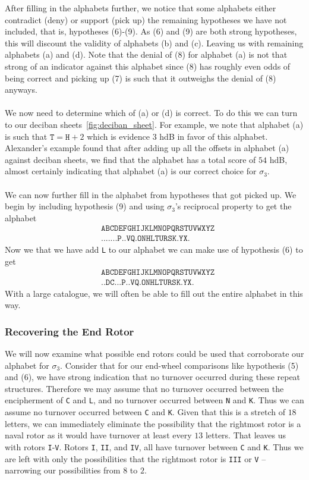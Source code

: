 \noindent  After filling in the alphabets further, we notice that some alphabets either contradict (deny) or support (pick up) the remaining hypotheses we have not included, that is, hypotheses (6)-(9). As (6) and (9) are both strong hypotheses, this will discount the validity of alphabets (b) and (c). Leaving us with remaining alphabets (a) and (d). Note that the denial of (8) for alphabet (a) is not that strong of an indicator against this alphabet since (8) has roughly even odds of being correct and picking up (7) is such that it outweighs the denial of (8) anyways.
\\\\We now need to determine which of (a) or (d) is correct. To do this we can turn to our deciban sheets~\ref{fig:deciban_sheet}. For example, we note that alphabet (a) is such that $\texttt{T} = \texttt{H} + 2$ which is evidence $3$ hdB in favor of this alphabet. Alexander's example found that after adding up all the offsets in alphabet (a) against deciban sheets, we find that the alphabet has a total score of $54$ hdB, almost certainly indicating that alphabet (a) is our correct choice for $\sigma_3$.
\\\\We can now further fill in the alphabet from hypotheses that got picked up. We begin by including hypothesis (9) and using $\sigma_3$'s reciprocal property to get the alphabet
\begin{align*}
	 & \texttt{ABCDEFGHIJKLMNOPQRSTUVWXYZ} \\
	 & \texttt{.......P..VQ.ONHLTURSK.YX.}
\end{align*}
Now we that we have add \texttt{L} to our alphabet we can make use of hypothesis (6) to get
\begin{align*}
	 & \texttt{ABCDEFGHIJKLMNOPQRSTUVWXYZ} \\
	 & \texttt{..DC...P..VQ.ONHLTURSK.YX.}
\end{align*}
With a large catalogue, we will often be able to fill out the entire alphabet in this way.

\subsubsection{Recovering the End Rotor}
We will now examine what possible end rotors could be used that corroborate our alphabet for $\sigma_3$. Consider that for our end-wheel comparisons like hypothesis (5) and (6), we have strong indication that no turnover occurred during these repeat structures. Therefore we may assume that no turnover occurred between the encipherment of \texttt{C} and \texttt{L}, and no turnover occurred between \texttt{N} and \texttt{K}. Thus we can assume no turnover occurred between \texttt{C} and \texttt{K}. Given that this is a stretch of $18$ letters, we can immediately eliminate the possibility that the rightmost rotor is a naval rotor as it would have turnover at least every $13$ letters. That leaves us with rotors \texttt{I}-\texttt{V}. Rotors \texttt{I}, \texttt{II}, and \texttt{IV}, all have turnover between \texttt{C} and \texttt{K}. Thus we are left with only the possibilities that the rightmost rotor is \texttt{III} or \texttt{V} -- narrowing our possibilities from $8$ to $2$.

